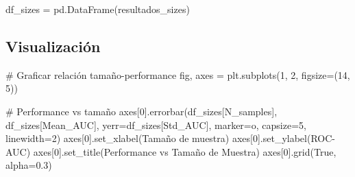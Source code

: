 \documentclass[
  doc,
  floatsintext,
  longtable,
  a4paper,
  nolmodern,
  notxfonts,
  notimes,
  12pt,
  colorlinks=true,linkcolor=blue,citecolor=blue,urlcolor=blue]{apa7}
\newenvironment{Shaded}{\begin{snugshade}}{\end{snugshade}}
\newcommand{\CommentTok}[1]{\textcolor[rgb]{0.37,0.37,0.37}{#1}}
\newcommand{\DecValTok}[1]{\textcolor[rgb]{0.68,0.00,0.00}{#1}}
\newcommand{\FloatTok}[1]{\textcolor[rgb]{0.68,0.00,0.00}{#1}}
\newcommand{\NormalTok}[1]{\textcolor[rgb]{0.00,0.23,0.31}{#1}}
\newcommand{\OperatorTok}[1]{\textcolor[rgb]{0.37,0.37,0.37}{#1}}
\newcommand{\StringTok}[1]{\textcolor[rgb]{0.13,0.47,0.30}{#1}}
\newcommand{\VariableTok}[1]{\textcolor[rgb]{0.07,0.07,0.07}{#1}}
\begin{document}
\begin{Shaded}
\begin{Highlighting}[]
\NormalTok{df\_sizes }\OperatorTok{=}\NormalTok{ pd.DataFrame(resultados\_sizes)}
\end{Highlighting}
\end{Shaded}

\subsection{Visualización}\label{visualizaciuxf3n}

\begin{Shaded}
\begin{Highlighting}[]
\CommentTok{\# Graficar relación tamaño{-}performance}
\NormalTok{fig, axes }\OperatorTok{=}\NormalTok{ plt.subplots(}\DecValTok{1}\NormalTok{, }\DecValTok{2}\NormalTok{, figsize}\OperatorTok{=}\NormalTok{(}\DecValTok{14}\NormalTok{, }\DecValTok{5}\NormalTok{))}

\CommentTok{\# Performance vs tamaño}
\NormalTok{axes[}\DecValTok{0}\NormalTok{].errorbar(df\_sizes[}\StringTok{\textquotesingle{}N\_samples\textquotesingle{}}\NormalTok{], df\_sizes[}\StringTok{\textquotesingle{}Mean\_AUC\textquotesingle{}}\NormalTok{],}
\NormalTok{                yerr}\OperatorTok{=}\NormalTok{df\_sizes[}\StringTok{\textquotesingle{}Std\_AUC\textquotesingle{}}\NormalTok{], marker}\OperatorTok{=}\StringTok{\textquotesingle{}o\textquotesingle{}}\NormalTok{, capsize}\OperatorTok{=}\DecValTok{5}\NormalTok{, linewidth}\OperatorTok{=}\DecValTok{2}\NormalTok{)}
\NormalTok{axes[}\DecValTok{0}\NormalTok{].set\_xlabel(}\StringTok{\textquotesingle{}Tamaño de muestra\textquotesingle{}}\NormalTok{)}
\NormalTok{axes[}\DecValTok{0}\NormalTok{].set\_ylabel(}\StringTok{\textquotesingle{}ROC{-}AUC\textquotesingle{}}\NormalTok{)}
\NormalTok{axes[}\DecValTok{0}\NormalTok{].set\_title(}\StringTok{\textquotesingle{}Performance vs Tamaño de Muestra\textquotesingle{}}\NormalTok{)}
\NormalTok{axes[}\DecValTok{0}\NormalTok{].grid(}\VariableTok{True}\NormalTok{, alpha}\OperatorTok{=}\FloatTok{0.3}\NormalTok{)}


\end{Highlighting}
\end{Shaded}
\end{document}
